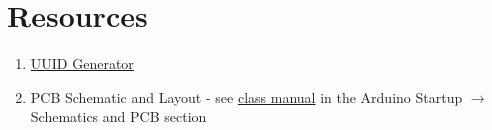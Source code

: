 \section{Resources}%
\begin{enumerate}
    \item \href{https://www.uuidgenerator.net/}{UUID Generator} 
    \item PCB Schematic and Layout - see 
            \href{https://github.com/semcneil/Fundamentals-of-Microcontrollers-Manual}{class manual} 
            in the Arduino Startup $\rightarrow$ Schematics and PCB section
\end{enumerate}


